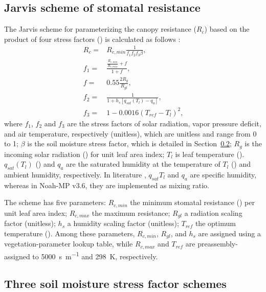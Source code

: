 \documentclass[essd, manuscript]{copernicus}
\let\unit\undefined
\begin{document}
\subsection{Jarvis scheme of stomatal resistance}\label{sec:app:noahmp:jarvis}

The Jarvis scheme for parameterizing the canopy resistance (\(R_{c}\)) based on the product of four stress factors (\unit{s.m^{-1}}) is calculated as follows \citep{chen1996JGRA, sellers1996JCa, jacquemin1990BM, jarvis1976PTRSLB}:
\begin{align}
  R_c =   & R_{c,min} \frac{1}{f_{1} f_{2} f_{3} \beta}
  \text{,} \\
  f_{1} = & \frac{\frac{R_{c,min}}{R_{c,max}}+f}{1+f}
  \text{,} \\
  f =     & 0.55 \frac{2 R_{g}}{R_{gl}}
  \text{,} \\
  f_{2} = & \frac{1}{1+h_s[q_{sat}(T_{l})-q_{a}]}
  \text{,} \\
  f_{3} = & 1- 0.0016 (T_{ref} - T_l)^2
  \text{,}
\end{align}
where \(f_{1}\), \(f_{2}\) and \(f_{3}\) are the stress factors of solar radiation, vapor pressure deficit, and air temperature, respectively (unitless), which are unitless and range from 0 to 1; \(\beta\) is the soil moisture stress factor, which is detailed in Section~\ref{sec:app:noahmp:beta}; \(R_{g}\) is the incoming solar radiation (\unit{W.m^{-2}}) for unit leaf area index; \(T_{l}\) is leaf temperature (\unit{K}). \(q_{sat}(T_l)\) (\unit{kg.kg^{-1}}) and \(q_a\) are the saturated humidity at the temperature of \(T_{l}\) (\unit{kg.kg^{-1}}) and ambient humidity, respectively. In literature \citep{chen1996JGRA, jacquemin1990BM}, \(q_{sat}{T_l}\) and \(q_a\) are specific humidity, whereas in Noah-MP v3.6, they are implemented as mixing ratio.

The scheme has five parameters: \(R_{c,min}\) the minimum stomatal resistance (\unit{s.m^{-1}}) per unit leaf area index; \(R_{c,max}\) the maximum resistance; \(R_{gl}\) a radiation scaling factor (unitless); \(h_{s}\) a humidity scaling factor (unitless); \(T_{ref}\) the optimum temperature (\unit{K}). Among these parameters, \(R_{c,min}\), \(R_{gl}\), and \(h_{s}\) are assigned using a vegetation-parameter lookup table, while \(R_{c,max}\) and \(T_{ref}\) are preassembly-assigned to \qty{5000}{s.m^{-1}} and \qty{298}{K}, respectively.

\subsection{Three soil moisture stress factor schemes}\label{sec:app:noahmp:beta}
\end{document}
